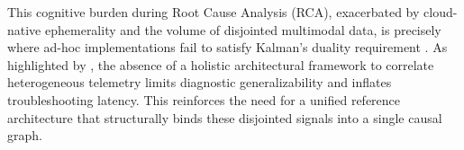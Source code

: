 This cognitive burden during Root Cause Analysis (RCA), exacerbated by cloud-native ephemerality and the volume of disjointed multimodal data, is precisely where ad-hoc implementations fail to satisfy Kalman's duality requirement \cite{han_2024, gomes_2025, li_2024}. As highlighted by , the absence of a holistic architectural framework to correlate heterogeneous telemetry limits diagnostic generalizability and inflates troubleshooting latency. This reinforces the need for a unified reference architecture that structurally binds these disjointed signals into a single causal graph.
